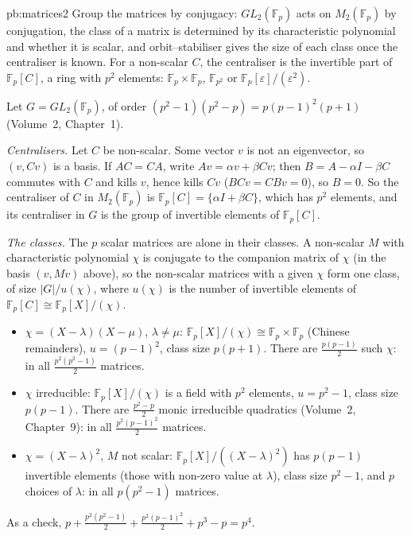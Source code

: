 \begin{solution}{pb:matrices2}
\idea Group the matrices by conjugacy: $GL_2(\mathbb F_p)$ acts on $M_2(\mathbb F_p)$ by conjugation, the class of a matrix is
determined by its characteristic polynomial and whether it is scalar, and orbit--stabiliser gives the size of each class
once the centraliser is known. For a non-scalar $C$, the centraliser is the invertible part of $\mathbb F_p[C]$, a ring with
$p^2$ elements: $\mathbb F_p\times\mathbb F_p$, $\mathbb F_{p^2}$ or $\mathbb F_p[\varepsilon]/(\varepsilon^2)$.

\writeup Let $G=GL_2(\mathbb F_p)$, of order $(p^2-1)(p^2-p)=p(p-1)^2(p+1)$ (Volume~2, Chapter~1).

\emph{Centralisers.} Let $C$ be non-scalar. Some vector $v$ is not an eigenvector, so $(v,Cv)$ is a basis. If $AC=CA$,
write $Av=\alpha v+\beta Cv$; then $B=A-\alpha I-\beta C$ commutes with $C$ and kills $v$, hence kills $Cv$ ($BCv=CBv=0$), so
$B=0$. So the centraliser of $C$ in $M_2(\mathbb F_p)$ is $\mathbb F_p[C]=\{\alpha I+\beta C\}$, which has $p^2$ elements,
and its centraliser in $G$ is the group of invertible elements of $\mathbb F_p[C]$.

\emph{The classes.} The $p$ scalar matrices are alone in their classes. A non-scalar $M$ with characteristic polynomial
$\chi$ is conjugate to the companion matrix of $\chi$ (in the basis $(v,Mv)$ above), so the non-scalar matrices with a given
$\chi$ form one class, of size $|G|/u(\chi)$, where $u(\chi)$ is the number of invertible elements of $\mathbb F_p[C]
\cong\mathbb F_p[X]/(\chi)$.
\begin{itemize}
\item $\chi=(X-\lambda)(X-\mu)$, $\lambda\ne\mu$: $\mathbb F_p[X]/(\chi)\cong\mathbb F_p\times\mathbb F_p$ (Chinese remainders),
$u=(p-1)^2$, class size $p(p+1)$. There are $\frac{p(p-1)}2$ such $\chi$: in all $\frac{p^2(p^2-1)}2$ matrices.
\item $\chi$ irreducible: $\mathbb F_p[X]/(\chi)$ is a field with $p^2$ elements, $u=p^2-1$, class size $p(p-1)$. There are
$\frac{p^2-p}2$ monic irreducible quadratics (Volume~2, Chapter~9): in all $\frac{p^2(p-1)^2}2$ matrices.
\item $\chi=(X-\lambda)^2$, $M$ not scalar: $\mathbb F_p[X]/((X-\lambda)^2)$ has $p(p-1)$ invertible elements (those with
non-zero value at $\lambda$), class size $p^2-1$, and $p$ choices of $\lambda$: in all $p(p^2-1)$ matrices.
\end{itemize}
As a check, $p+\frac{p^2(p^2-1)}2+\frac{p^2(p-1)^2}2+p^3-p=p^4$.


\end{solution}
